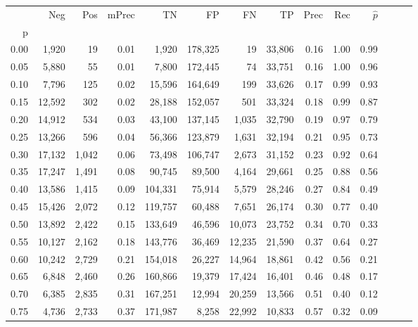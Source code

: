 \begin{tabular}{rrrrrrrrrrrrrr}
\toprule
{} &     Neg &    Pos & mPrec &       TN &       FP &      FN &      TP &  Prec &   Rec & $\hat{p}$ \\
p    &         &        &       &          &          &         &         &       &       &           \\
\midrule
0.00 &   1,920 &     19 &  0.01 &    1,920 &  178,325 &      19 &  33,806 &  0.16 &  1.00 &      0.99 \\
0.05 &   5,880 &     55 &  0.01 &    7,800 &  172,445 &      74 &  33,751 &  0.16 &  1.00 &      0.96 \\
0.10 &   7,796 &    125 &  0.02 &   15,596 &  164,649 &     199 &  33,626 &  0.17 &  0.99 &      0.93 \\
0.15 &  12,592 &    302 &  0.02 &   28,188 &  152,057 &     501 &  33,324 &  0.18 &  0.99 &      0.87 \\
0.20 &  14,912 &    534 &  0.03 &   43,100 &  137,145 &   1,035 &  32,790 &  0.19 &  0.97 &      0.79 \\
0.25 &  13,266 &    596 &  0.04 &   56,366 &  123,879 &   1,631 &  32,194 &  0.21 &  0.95 &      0.73 \\
0.30 &  17,132 &  1,042 &  0.06 &   73,498 &  106,747 &   2,673 &  31,152 &  0.23 &  0.92 &      0.64 \\
0.35 &  17,247 &  1,491 &  0.08 &   90,745 &   89,500 &   4,164 &  29,661 &  0.25 &  0.88 &      0.56 \\
0.40 &  13,586 &  1,415 &  0.09 &  104,331 &   75,914 &   5,579 &  28,246 &  0.27 &  0.84 &      0.49 \\
0.45 &  15,426 &  2,072 &  0.12 &  119,757 &   60,488 &   7,651 &  26,174 &  0.30 &  0.77 &      0.40 \\
0.50 &  13,892 &  2,422 &  0.15 &  133,649 &   46,596 &  10,073 &  23,752 &  0.34 &  0.70 &      0.33 \\
0.55 &  10,127 &  2,162 &  0.18 &  143,776 &   36,469 &  12,235 &  21,590 &  0.37 &  0.64 &      0.27 \\
0.60 &  10,242 &  2,729 &  0.21 &  154,018 &   26,227 &  14,964 &  18,861 &  0.42 &  0.56 &      0.21 \\
0.65 &   6,848 &  2,460 &  0.26 &  160,866 &   19,379 &  17,424 &  16,401 &  0.46 &  0.48 &      0.17 \\
0.70 &   6,385 &  2,835 &  0.31 &  167,251 &   12,994 &  20,259 &  13,566 &  0.51 &  0.40 &      0.12 \\
0.75 &   4,736 &  2,733 &  0.37 &  171,987 &    8,258 &  22,992 &  10,833 &  0.57 &  0.32 &      0.09 \\

\end{tabular}
